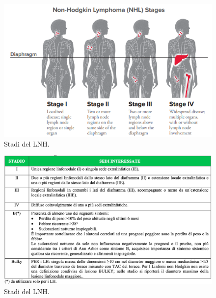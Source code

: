 \begin{figure}[h]
    \begin{center}
    \includegraphics[width=1.0\columnwidth]{img/nhl_staging_2018.png}
    \end{center}
    \caption[Stadi del LNH.]{Stadi del LNH.
    \cite{img16}}

\end{figure}

\begin{figure}[h]
    \begin{center}
    \includegraphics[width=1.0\columnwidth]{img/LUGANO AIOM.png}
    \end{center}
    \caption[Stadi del LNH.]{Stadi del LNH.
    \cite{img17}}

\end{figure}

